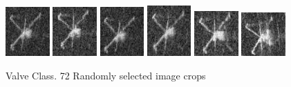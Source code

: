 \begin{figure}
    \includegraphics[width=0.15\textwidth]{chapters/images/dataset/all-class-images/valve/valve-121.jpg}
    \includegraphics[width=0.15\textwidth]{chapters/images/dataset/all-class-images/valve/valve-112.jpg}
    \includegraphics[width=0.15\textwidth]{chapters/images/dataset/all-class-images/valve/valve-122.jpg}
    \includegraphics[width=0.15\textwidth]{chapters/images/dataset/all-class-images/valve/valve-154.jpg}
    \includegraphics[width=0.15\textwidth]{chapters/images/dataset/all-class-images/valve/valve-189.jpg}
    \includegraphics[width=0.15\textwidth]{chapters/images/dataset/all-class-images/valve/valve-49.jpg}
    
    \caption{Valve Class. 72 Randomly selected image crops}
    \label{appendix:valve}  
\end{figure}

